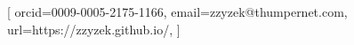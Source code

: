 \author[1]{ Zzyv Zzyzek }[%
  orcid=0009-0005-2175-1166,
  email=zzyzek@thumpernet.com,
  url=https://zzyzek.github.io/,
]


